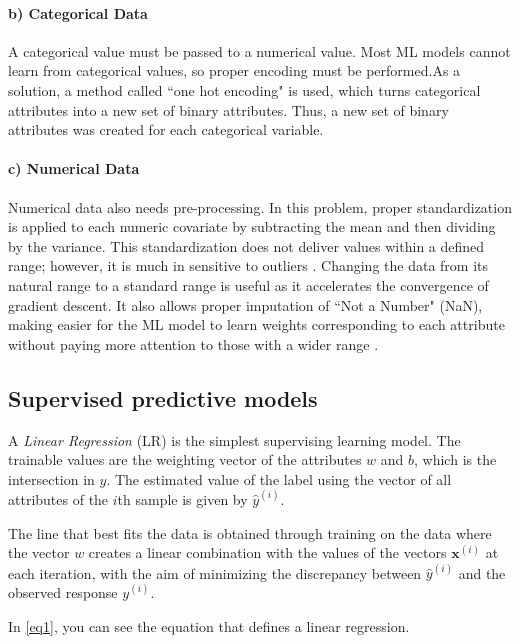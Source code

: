 \documentclass[conference]{IEEEtran}
\begin{document}
\paragraph*{b) Categorical Data}

A categorical value must be passed to a numerical value. Most ML models cannot learn from categorical values, so proper encoding must be performed.As a solution, a method called ``one hot encoding" is used, which turns categorical attributes into a new set of binary attributes. Thus, a new set of binary attributes was created for each categorical variable.

\paragraph*{c) Numerical Data} 

Numerical data also needs pre-processing. In this problem, proper standardization is applied to each numeric covariate by subtracting the mean and then dividing by the variance. This standardization does not deliver values within a defined range; however, it is much in sensitive to outliers \cite{hands_on_book}. Changing the data from its natural range to a standard range is useful as it accelerates the convergence of gradient descent. It also allows proper imputation of ``Not a Number" (NaN), making easier for the ML model to learn weights corresponding to each attribute without paying more attention to those with a wider range \cite{curso_google}.

\subsection{Supervised predictive models}

A \textit{Linear Regression} (LR) is the simplest supervising learning model. The trainable values are the weighting vector of the attributes $w$ and $b$, which is the intersection in $y$. The estimated value of the label using the vector of all attributes of the $i$th sample is given by $\hat{y}^{(i)}$. 

The line that best fits the data is obtained through training on the data where the vector $w$ creates a linear combination with the values of the vectors $\boldsymbol{x}^{(i)}$ at each iteration, with the aim of minimizing the discrepancy between $\hat{y}^{(i)}$ and the observed response $y^{(i)}$.

In \eqref{eq1}, you can see the equation that defines a linear regression.
\end{document}
